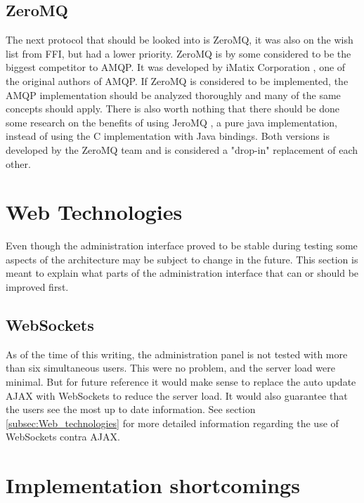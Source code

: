 \subsection{ZeroMQ}
The next protocol that should be looked into is ZeroMQ, it was also on the wish list from FFI, but had a lower priority. ZeroMQ is by some considered to be the biggest competitor to AMQP. It was developed by iMatix Corporation \cite{imatix}, one of the original authors of AMQP. If ZeroMQ is considered to be implemented, the AMQP implementation should be analyzed thoroughly and many of the same concepts should apply. There is also worth nothing that there should be done some research on the benefits of using JeroMQ \cite{jero-mq}, a pure java implementation, instead of using the C implementation with Java bindings. Both versions is developed by the ZeroMQ team and is considered a "drop-in" replacement of each other.

\section{Web Technologies}
Even though the administration interface proved to be stable during testing some aspects of the architecture may be subject to change in the future. This section is meant to explain what parts of the administration interface that can or should be improved first. 

\subsection{WebSockets}
As of the time of this writing, the administration panel is not tested with more than six simultaneous users. This were no problem, and the server load were minimal. But for future reference it would make sense to replace the auto update AJAX with WebSockets to reduce the server load. It would also guarantee that the users see the most up to date information. See section \ref{subsec:Web_technologies} for more detailed information regarding the use of WebSockets contra AJAX.

\section{Implementation shortcomings}


\clearpage
